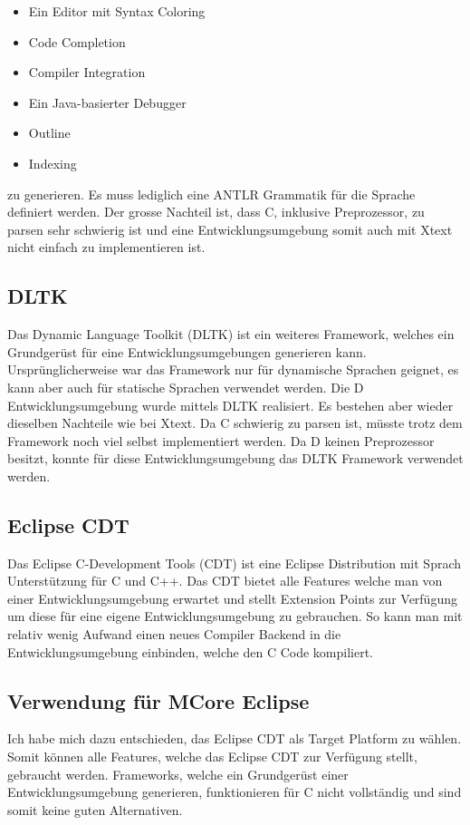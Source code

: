 \begin{itemize} 
	\item Ein Editor mit Syntax Coloring
	\item Code Completion
	\item Compiler Integration
	\item Ein Java-basierter Debugger
	\item Outline
	\item Indexing
\end{itemize}

zu generieren. \cite{xtext} Es muss lediglich eine ANTLR\cite{antlr} Grammatik für die Sprache definiert werden. Der grosse Nachteil ist, dass C, inklusive Preprozessor, zu parsen sehr schwierig ist und eine Entwicklungsumgebung somit auch mit Xtext nicht einfach zu implementieren ist.

\subsection{DLTK}
Das Dynamic Language Toolkit (DLTK) ist ein weiteres Framework, welches ein Grundgerüst für eine Entwicklungsumgebungen generieren kann. Ursprünglicherweise war das Framework nur für dynamische Sprachen geignet, es kann aber auch für statische Sprachen verwendet werden. Die D Entwicklungsumgebung wurde mittels DLTK realisiert\cite{ddt}. Es bestehen aber wieder dieselben Nachteile wie bei Xtext. Da C schwierig zu parsen ist, müsste trotz dem Framework noch viel selbst implementiert werden. Da D keinen Preprozessor besitzt, konnte für diese Entwicklungsumgebung das DLTK Framework verwendet werden.

\subsection{Eclipse CDT}
Das Eclipse C-Development Tools (CDT) ist eine Eclipse Distribution mit Sprach Unterstützung für C und C++. Das CDT bietet alle Features welche man von einer Entwicklungsumgebung erwartet und stellt Extension Points zur Verfügung um diese für eine eigene Entwicklungsumgebung zu gebrauchen. So kann man mit relativ wenig Aufwand einen neues Compiler Backend in die Entwicklungsumgebung einbinden, welche den C Code kompiliert.

\subsection{Verwendung für MCore Eclipse}
Ich habe mich dazu entschieden, das Eclipse CDT als Target Platform zu wählen. Somit können alle Features, welche das Eclipse CDT zur Verfügung stellt, gebraucht werden. Frameworks, welche ein Grundgerüst einer Entwicklungsumgebung generieren, funktionieren für C nicht vollständig und sind somit keine guten Alternativen.
